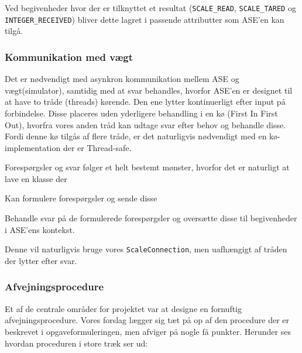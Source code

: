 \documentclass[a4paper]{article}
\newenvironment{my_enumerate}
{\begin{enumerate}
  \setlength{\itemsep}{1pt}
  \setlength{\parskip}{0pt}
  \setlength{\parsep}{0pt}}
{\end{enumerate}}
\begin{document}
Ved begivenheder hvor der er tilknyttet et resultat (\texttt{SCALE\_READ}, \texttt{SCALE\_TARED} og \texttt{INTEGER\_RECEIVED}) bliver dette lagret i passende attributter som ASE'en kan tilgå.


\subsubsection{Kommunikation med vægt} %

Det er nødvendigt med asynkron kommunikation mellem ASE og vægt(simulator), samtidig med at svar behandles, hvorfor ASE'en er designet til at have to tråde (threads) kørende. Den ene lytter kontinuerligt efter input på forbindelse. Disse placeres uden yderligere behandling i en kø (First In First Out), hvorfra vores anden tråd kan udtage svar efter behov og behandle disse. Fordi denne kø tilgås af flere tråde, er det naturligvis nødvendigt med en kø-implementation der er Thread-safe.

Forespørgsler og svar følger et helt bestemt mønster, hvorfor det er naturligt at lave en klasse der
\begin{my_enumerate}
  \item Kan formulere forespørgsler og sende disse
  \item Behandle svar på de formulerede forespørgsler og oversætte disse til begivenheder i ASE'ens kontekst.
\end{my_enumerate}
Denne vil naturligvis bruge vores \texttt{ScaleConnection}, men uafhængigt af tråden der lytter efter svar.


\subsubsection{Afvejningsprocedure} %

Et af de centrale områder for projektet var at designe en fornuftig afvejningsprocedure. Vores forslag lægger sig tæt på op af den procedure der er beskrevet i opgaveformuleringen, men afviger på nogle få punkter. Herunder ses hvordan proceduren i store træk ser ud:
\end{document}
